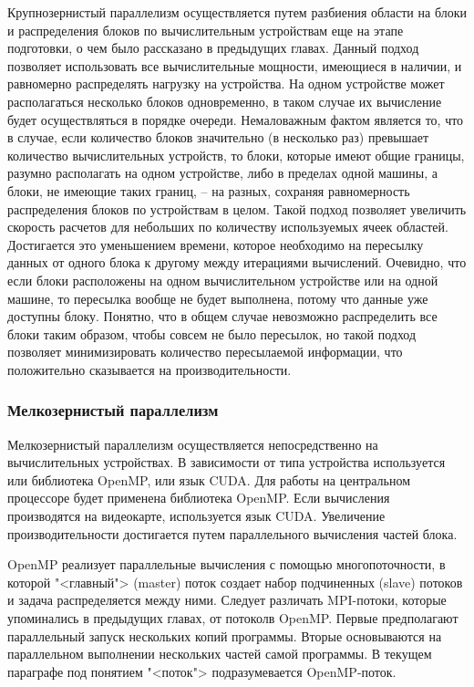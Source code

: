 \documentclass[a4paper, 14pt]{extarticle}
\theoremstyle{definition}
\begin{document}
\par Крупнозернистый параллелизм осуществляется путем разбиения области на блоки и распределения блоков по вычислительным устройствам еще на этапе подготовки, о чем было рассказано в предыдущих главах. Данный подход позволяет использовать все вычислительные мощности, имеющиеся в наличии, и равномерно распределять нагрузку на устройства. На одном устройстве может располагаться несколько блоков одновременно, в таком случае их вычисление будет осуществляться в порядке очереди. Немаловажным фактом является то, что в случае, если количество блоков значительно (в несколько раз) превышает количество вычислительных устройств, то блоки, которые имеют общие границы, разумно располагать на одном устройстве, либо в пределах одной машины, а блоки, не имеющие таких границ, -- на разных, сохраняя равномерность распределения блоков по устройствам в целом. Такой подход позволяет увеличить скорость расчетов для небольших по количеству используемых ячеек областей. Достигается это уменьшением времени, которое необходимо на пересылку данных от одного блока к другому между итерациями вычислений. Очевидно, что если блоки расположены на одном вычислительном устройстве или на одной машине, то пересылка вообще не будет выполнена, потому что данные уже доступны блоку. Понятно, что в общем случае невозможно распределить все блоки таким образом, чтобы совсем не было пересылок, но такой подход позволяет минимизировать количество пересылаемой информации, что положительно сказывается на производительности.

\subsubsection{Мелкозернистый параллелизм}

\par Мелкозернистый параллелизм осуществляется непосредственно на вычислительных устройствах. В зависимости от типа устройства используется или библиотека OpenMP, или язык CUDA. Для работы на центральном процессоре будет применена библиотека OpenMP. Если вычисления производятся на видеокарте, используется язык CUDA. Увеличение производительности достигается путем параллельного вычисления частей блока.

\par OpenMP реализует параллельные вычисления с помощью многопоточности, в которой "<главный"> (master) поток создает набор подчиненных (slave) потоков и задача распределяется между ними. Следует различать MPI-потоки, которые упоминались в предыдущих главах, от потоколв OpenMP. Первые предполагают параллельный запуск нескольких копий программы. Вторые основываются на параллельном выполнении нескольких частей самой программы. В текущем параграфе под понятием "<поток"> подразумевается OpenMP-поток.
\end{document}
